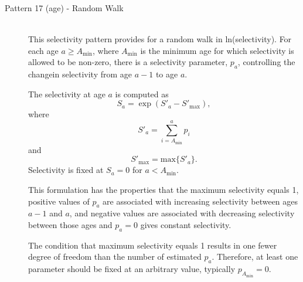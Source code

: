 \begin{description}
	\item[Pattern 17 (age) - Random Walk]\hfill\\
	This selectivity pattern provides for a random walk in ln(selectivity).  For each age $a \geq A_{\text{min}}$, where $A_{\text{min}}$ is the minimum age for which selectivity is allowed to be non-zero, there is a selectivity parameter, $p_a$, controlling the changein selectivity from age $a-1$ to age $a$.
	
	The selectivity at age $a$ is computed as
	\begin{equation}
	S_a = \exp (S'_a - S'_{\text{max}}),
	\end{equation}
	where
	\begin{equation}
	S'_a = \sum_{i = A_{\text{min}}}^a p_i
	\end{equation}
	and 
	\begin{equation}
	S'_{\text{max}} = \mbox{max} \{S'_a\}.
	\end{equation}
	Selectivity is fixed at $S_a = 0$ for $a < A_{\text{min}}$. 
	
	This formulation has the properties that the maximum selectivity equals 1,
	positive values of $p_a$ are associated with increasing selectivity between ages $a-1$
	and $a$, and negative values are associated with decreasing selectivity between
	those ages and $p_a = 0$ gives constant selectivity.
	
	The condition that maximum selectivity equals 1 results in one fewer
	degree of freedom than the number of estimated $p_a$. Therefore, at least
	one parameter should be fixed at an arbitrary value,
	typically $p_{A_{\text{min}}}=0$.
	

\end{description}
